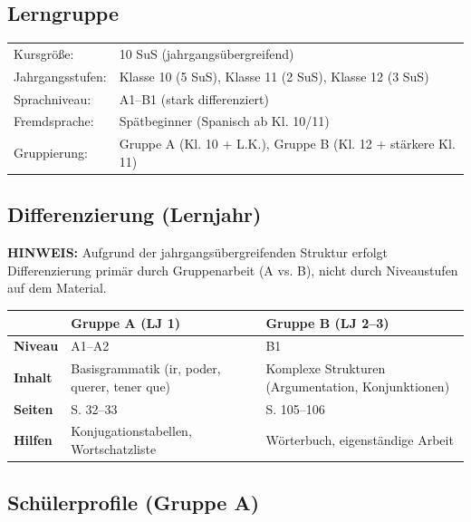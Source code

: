 \documentclass[11pt,a4paper]{article}
\newcommand{\lerngruppengroesse}{10}
\begin{document}
\subsection{Lerngruppe}
\begin{tabular}{ll}
    Kursgröße: & \lerngruppengroesse{} SuS (jahrgangsübergreifend) \\
    Jahrgangsstufen: & Klasse 10 (5 SuS), Klasse 11 (2 SuS), Klasse 12 (3 SuS) \\
    Sprachniveau: & A1--B1 (stark differenziert) \\
    Fremdsprache: & Spätbeginner (Spanisch ab Kl. 10/11) \\
    Gruppierung: & Gruppe A (Kl. 10 + L.K.), Gruppe B (Kl. 12 + stärkere Kl. 11) \\
\end{tabular}

\subsection{Differenzierung (Lernjahr)}

\textbf{HINWEIS:} Aufgrund der jahrgangsübergreifenden Struktur erfolgt Differenzierung primär durch Gruppenarbeit (A vs. B), nicht durch Niveaustufen auf dem Material.

\begin{tabular}{|l|p{5cm}|p{5cm}|}
\hline
& \textbf{Gruppe A (LJ 1)} & \textbf{Gruppe B (LJ 2--3)} \\
\hline
\textbf{Niveau} & A1--A2 & B1 \\
\hline
\textbf{Inhalt} & Basisgrammatik (ir, poder, querer, tener que) & Komplexe Strukturen (Argumentation, Konjunktionen) \\
\hline
\textbf{Seiten} & S. 32--33 & S. 105--106 \\
\hline
\textbf{Hilfen} & Konjugationstabellen, Wortschatzliste & Wörterbuch, eigenständige Arbeit \\
\hline
\end{tabular}

\subsection{Schülerprofile (Gruppe A)}
\end{document}
